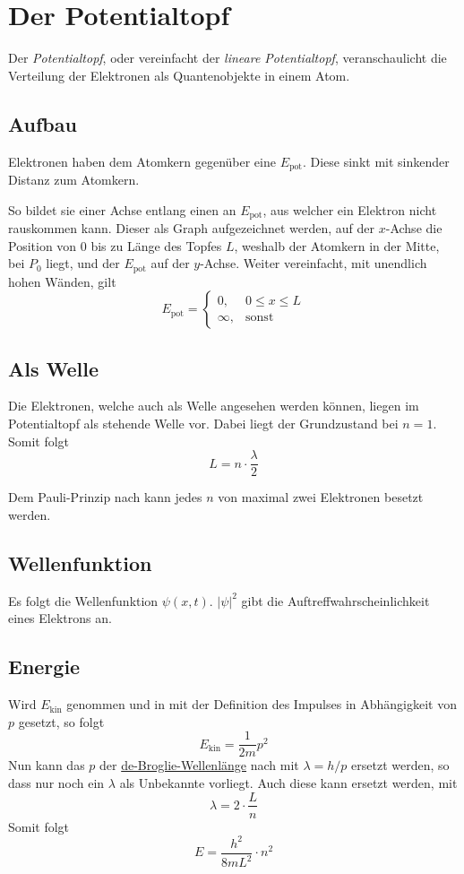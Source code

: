 \documentclass{article}
\newcommand{\ekin}[0]{E_{\text{kin}}}
\newcommand{\epot}[0]{E_{\text{pot}}}
\begin{document}
 
\section{Der Potentialtopf}
Der \emph{Potentialtopf}, oder vereinfacht der \emph{lineare Potentialtopf}, veranschaulicht die Verteilung der Elektronen als Quantenobjekte in einem Atom.
 
\subsection{Aufbau} 
Elektronen haben dem Atomkern gegenüber eine $\epot$. Diese sinkt mit sinkender Distanz zum Atomkern.
 
So bildet sie einer Achse entlang einen  an $\epot$, aus welcher ein Elektron nicht rauskommen kann. Dieser als Graph aufgezeichnet werden, auf der $x$-Achse die Position von $0$ bis zu Länge des Topfes $L$, weshalb der Atomkern in der Mitte, bei $P_0$ liegt, und der $\epot$ auf der $y$-Achse. Weiter vereinfacht, mit unendlich hohen Wänden, gilt
\[ 
 \epot =  
 \begin{cases} 
  0, & 0 \le x \le L \\
  \infty, & \text{sonst}
 \end{cases}
\] 
 
\subsection{Als Welle}
Die Elektronen, welche auch als Welle angesehen werden können, liegen im Potentialtopf als stehende Welle vor. Dabei liegt der Grundzustand bei $n=1$. Somit folgt
\[
 L = n \cdot \frac{\lambda}{2} 
\]
 
Dem Pauli-Prinzip nach kann jedes $n$ von maximal zwei Elektronen besetzt werden.
 
\subsection{Wellenfunktion} 
Es folgt die Wellenfunktion $\psi(x,t)$. $\vert \psi \vert^2$ gibt die Auftreffwahrscheinlichkeit eines Elektrons an.
 
\subsection{Energie} 
Wird $\ekin$ genommen und in mit der Definition des Impulses in Abhängigkeit von $p$ gesetzt, so folgt
\[
 \ekin = \frac{1}{2m} p^2
\]
Nun kann das $p$ der \hyperref[Die de-Broglie-Wellenlänge]{de-Broglie-Wellenlänge} nach mit $\lambda = h/p$ ersetzt werden, so dass nur noch ein $\lambda$ als Unbekannte vorliegt. Auch diese kann ersetzt werden, mit
\[
 \lambda = 2 \cdot \frac{L}{n} 
\]
Somit folgt
\[
 E = \frac{h^2}{8mL^2} \cdot n^2
\]
 
\end{document}
